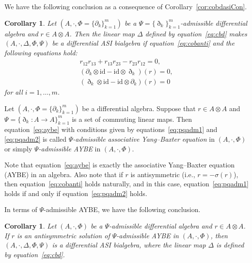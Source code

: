\documentclass[10pt,a4paper]{amsart}
\numberwithin{equation}{section}
\newtheorem{Corollary}[Theorem]{Corollary}
\newcommand{\id}{\mathrm{id}}
\begin{document}
We have the following conclusion as a consequence of Corollary~\ref{cor:cobdasiCon}.
\begin{Corollary}
 Let $(A, \cdot, \Phi = \{\partial_k\}_{k=1}^m)$ be a $\Psi = \{\eth_k\}_{k=1}^m$-admissible differential algebra and $r \in A \otimes A$.
 Then the linear map $\Delta$ defined by equation~\eqref{eq:cbd} makes $(A, \cdot, \Delta, \Phi, \Psi)$ be a differential ASI bialgebra
 if equation~\eqref{eq:cobanti} and the following equations hold:
 \begin{gather}
 r_{12} r_{13} + r_{13} r_{23} - r_{23} r_{12} = 0,\label{eq:aybe} \\
 (\partial_k \otimes \id - \id \otimes \eth_k)(r) = 0, \label{eq:pqadm1} \\
 (\eth_k \otimes \id - \id \otimes \partial_k)(r) = 0 \label{eq:pqadm2}
 \end{gather}
	for all $i=1, \dots, m$.
\end{Corollary}

\begin{Definition}
 Let $(A, \cdot, \Phi = \{\partial_k\}_{k=1}^m)$ be a differential algebra.
 Suppose that $r \in A \otimes A$ and $\Psi = \{\eth_k\colon A \to A\}_{k=1}^m$ is a set of commuting linear maps.
 Then equation~\eqref{eq:aybe} with conditions given by equations~\eqref{eq:pqadm1} and \eqref{eq:pqadm2} is called
 \textit{$\Psi$-admissible associative Yang--Baxter equation} in $(A, \cdot, \Phi)$ or simply \textit{$\Psi$-admissible AYBE} in $(A, \cdot, \Phi)$.
\end{Definition}

\begin{Remark}
 Note that equation~\eqref{eq:aybe} is exactly the associative Yang--Baxter equation (AYBE) in an algebra.
 Also note that if $r$ is antisymmetric (i.e., $r = - \sigma(r)$),
 then equation~\eqref{eq:cobanti} holds naturally, and in this case, equation~\eqref{eq:pqadm1} holds if and only if equation~\eqref{eq:pqadm2} holds.
\end{Remark}

In terms of $\Psi$-admissible AYBE, we have the following conclusion.
\begin{Corollary}\label{cor:admAYBEdasi}
 Let $(A, \cdot, \Phi)$ be a $\Psi$-admissible differential algebra and $r \in A \otimes A$.
 If $r$ is an antisymmetric solution of $\Psi$-admissible AYBE in $(A, \cdot, \Phi)$,
 then $(A, \cdot, \Delta, \Phi ,\Psi)$ is a differential ASI bialgebra,
 where the linear map $\Delta$ is defined by equation~\eqref{eq:cbd}.
\end{Corollary}
\end{document}
